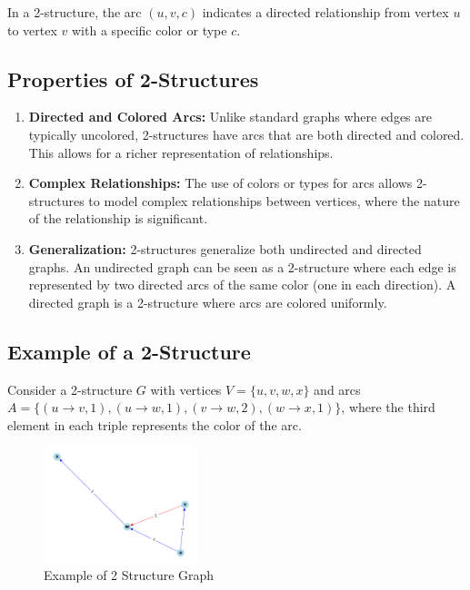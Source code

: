 In a 2-structure, the arc $(u, v, c)$ indicates a directed relationship from vertex $u$ to vertex $v$ with a specific color or type $c$.

\subsection*{Properties of 2-Structures}

\begin{enumerate}
    \item \textbf{Directed and Colored Arcs:} Unlike standard graphs where edges are typically uncolored, 2-structures have arcs that are both directed and colored.
    This allows for a richer representation of relationships.
    \item \textbf{Complex Relationships:} The use of colors or types for arcs allows 2-structures to model complex relationships between vertices, where the nature of the relationship is significant.
    \item \textbf{Generalization:} 2-structures generalize both undirected and directed graphs.
    An undirected graph can be seen as a 2-structure where each edge is represented by two directed arcs of the same color (one in each direction).
    A directed graph is a 2-structure where arcs are colored uniformly.
\end{enumerate}

\subsection*{Example of a 2-Structure}

Consider a 2-structure $G$ with vertices $V = \{u, v, w, x\}$ and arcs $A = \{(u \rightarrow v, 1), (u \rightarrow w, 1), (v \rightarrow w, 2), (w \rightarrow x, 1)\}$, where the third element in each triple represents the color of the arc.

\begin{figure}[!h]
    \centering
    \includegraphics[width=0.40\textwidth]{images/graphs/2_structure_graph_example}
    \caption{Example of 2 Structure Graph}
    \label{fig:2-structure-graph-example-simple}
\end{figure}

